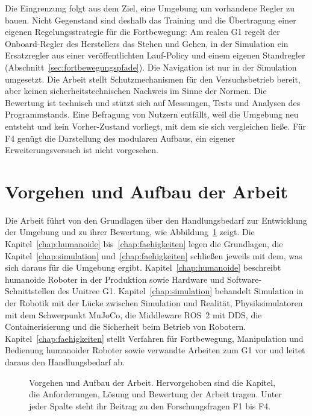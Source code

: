 Die Eingrenzung folgt aus dem Ziel, eine Umgebung um vorhandene Regler zu bauen.
Nicht Gegenstand sind deshalb das Training und die Übertragung einer eigenen Regelungsstrategie für die Fortbewegung: Am realen G1 regelt der Onboard-Regler des Herstellers das Stehen und Gehen, in der Simulation ein Ersatzregler aus einer veröffentlichten Lauf-Policy und einem eigenen Standregler (Abschnitt~\ref{sec:fortbewegungspfade}).
Die Navigation ist nur in der Simulation umgesetzt.
Die Arbeit stellt Schutzmechanismen für den Versuchsbetrieb bereit, aber keinen sicherheitstechnischen Nachweis im Sinne der Normen.
Die Bewertung ist technisch und stützt sich auf Messungen, Tests und Analysen des Programmstands.
Eine Befragung von Nutzern entfällt, weil die Umgebung neu entsteht und kein Vorher-Zustand vorliegt, mit dem sie sich vergleichen ließe.
Für F4 genügt die Darstellung des modularen Aufbaus, ein eigener Erweiterungsversuch ist nicht vorgesehen.

\section{Vorgehen und Aufbau der Arbeit}
\label{sec:aufbau}
Die Arbeit führt von den Grundlagen über den Handlungsbedarf zur Entwicklung der Umgebung und zu ihrer Bewertung, wie Abbildung~\ref{fig:aufbau} zeigt.
Die Kapitel~\ref{chap:humanoide} bis~\ref{chap:faehigkeiten} legen die Grundlagen, die Kapitel~\ref{chap:simulation} und~\ref{chap:faehigkeiten} schließen jeweils mit dem, was sich daraus für die Umgebung ergibt.
Kapitel~\ref{chap:humanoide} beschreibt humanoide Roboter in der Produktion sowie Hardware und Software-Schnittstellen des Unitree G1.
Kapitel~\ref{chap:simulation} behandelt Simulation in der Robotik mit der Lücke zwischen Simulation und Realität, Physiksimulatoren mit dem Schwerpunkt MuJoCo, die Middleware ROS~2 mit DDS, die Containerisierung und die Sicherheit beim Betrieb von Robotern.
Kapitel~\ref{chap:faehigkeiten} stellt Verfahren für Fortbewegung, Manipulation und Bedienung humanoider Roboter sowie verwandte Arbeiten zum G1 vor und leitet daraus den Handlungsbedarf ab.

\begin{figure}[htbp]
  \centering
  
  \caption[Vorgehen und Aufbau der Arbeit]{Vorgehen und Aufbau der Arbeit. Hervorgehoben sind die Kapitel, die Anforderungen, Lösung und Bewertung der Arbeit tragen. Unter jeder Spalte steht ihr Beitrag zu den Forschungsfragen F1 bis F4.}
  \label{fig:aufbau}
\end{figure}

